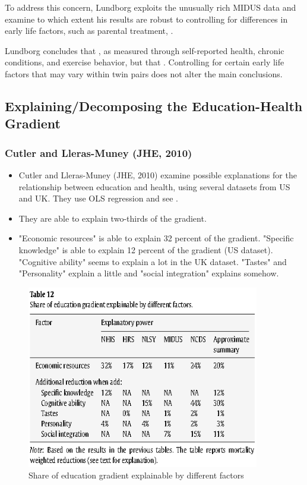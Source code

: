         To address this concern, Lundborg exploits the unusually rich MIDUS data and examine to which extent his results are robust to controlling for differences in early life factors, such as parental treatment, .

        Lundborg concludes that , as measured through self-reported health, chronic conditions, and exercise behavior, but that . Controlling for certain early life factors that may vary within twin pairs does not alter the main conclusions.


    \subsection{Explaining/Decomposing the Education-Health Gradient}

        \subsubsection{Cutler and Lleras-Muney (JHE, 2010)}

            \begin{itemize}
                    \item Cutler and Lleras-Muney (JHE, 2010) examine possible explanations for the relationship between education and health, using several datasets from US and UK. They use OLS regression and see .
                    \item They are able to explain two-thirds of the gradient.
                    \item "Economic resources" is able to explain 32 percent of the gradient. "Specific knowledge" is able to explain 12 percent of the gradient (US dataset). "Cognitive ability" seems to explain a lot in the UK dataset. "Tastes" and "Personality" explain a little and "social integration" explains somehow.
            \end{itemize}
            \begin{figure}[H]%
                \centering
                \includegraphics[width=4in]{images/ch3/41.png}
                \caption{Share of education gradient explainable by different factors}
            \end{figure}
                
